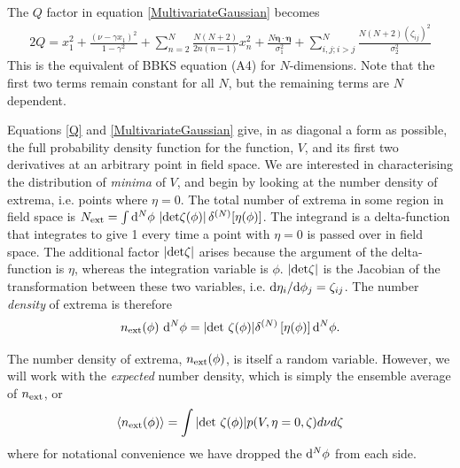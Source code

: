 \documentclass[12pt]{article}
\begin{document}
The $Q$ factor in equation \eqref{MultivariateGaussian} becomes
%
\begin{equation} \label{Q}
\begin{split}
2Q = x_1^2 + \frac{(\nu-\gamma x_1)^2}{1-\gamma^2}+\sum_{n=2}^N\frac{N(N+2)}{2n(n-1)}x_n^2 + \frac{N \pmb{\eta}\cdot \pmb{\eta}}{\sigma_1^2} + \sum_{i,j;i > j}^N\frac{N(N+2)(\zeta_{ij})^2}{\sigma_2^2}
\end{split}
\end{equation}
%
This is the equivalent of BBKS equation (A4) for $N$-dimensions. Note that the first two terms remain constant for all $N$, but the remaining terms are $N$ dependent.

Equations \eqref{Q} and \eqref{MultivariateGaussian} give, in as diagonal a form as possible, the full probability density function for the function, $V$, and its first two derivatives at an arbitrary point in field space. We are interested in characterising the distribution of \emph{minima} of $V$, and begin by looking at the number density of extrema, i.e. points where $\eta=0$. The total number of extrema in some region in field space is $N_{\rm ext} = \int {\rm d}^N\phi \, \left| {\rm det}\zeta(\phi)\right|\delta^{(N)}[\eta(\phi)]$. The integrand is a delta-function that integrates to give 1 every time a point with $\eta=0$ is passed over in field space. The additional factor $\left| {\rm det \zeta} \right|$ arises because the argument of the delta-function is $\eta$, whereas the integration variable is $\phi$. $|{\rm det}\zeta|$ is the Jacobian of the transformation between these two variables, i.e. ${\rm d}\eta_i/{\rm d}\phi_j = \zeta_{ij}$. The number \emph{density} of extrema is therefore
%
\begin{equation}
n_{\rm ext}(\phi) \,\,{\rm d}^N \phi= |{\rm det}\,\, \zeta(\phi)| \delta^{(N)}\left[ \eta(\phi)\right] {\rm d}^N \phi.
\end{equation}

%
The number density of extrema, $n_{\rm ext}(\phi)$, is itself a random variable. However, we will work with the \emph{expected} number density, which is simply the ensemble average of $n_{\rm ext}$, or
% 
\begin{equation} \label{NumberDensity}
\langle n_{\rm ext}(\phi)  \rangle= \int |{\rm det}\,\, \zeta(\phi)| p(V,\eta=0,\zeta)d\nu d\zeta
\end{equation}
where for notational convenience we have dropped the ${\rm d}^N \phi$ from each side.
\end{document}
